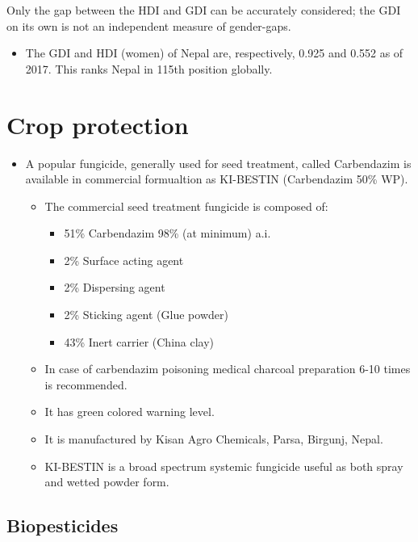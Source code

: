\documentclass[]{book}
\providecommand{\tightlist}{%
  \setlength{\itemsep}{0pt}\setlength{\parskip}{0pt}}
\begin{document}
Only the gap between the HDI and GDI can be accurately considered; the GDI on its own is not an independent measure of gender-gaps.

\begin{itemize}
\tightlist
\item
  The GDI and HDI (women) of Nepal are, respectively, 0.925 and 0.552 as of 2017. This ranks Nepal in 115th position globally.
\end{itemize}

\hypertarget{crop-protection}{%
\chapter{Crop protection}\label{crop-protection}}

\begin{itemize}
\tightlist
\item
  A popular fungicide, generally used for seed treatment, called Carbendazim is available in commercial formualtion as KI-BESTIN (Carbendazim 50\% WP).

  \begin{itemize}
  \tightlist
  \item
    The commercial seed treatment fungicide is composed of:

    \begin{itemize}
    \tightlist
    \item
      51\% Carbendazim 98\% (at minimum) a.i.
    \item
      2\% Surface acting agent
    \item
      2\% Dispersing agent
    \item
      2\% Sticking agent (Glue powder)
    \item
      43\% Inert carrier (China clay)
    \end{itemize}
  \item
    In case of carbendazim poisoning medical charcoal preparation 6-10 times is recommended.
  \item
    It has green colored warning level.
  \item
    It is manufactured by Kisan Agro Chemicals, Parsa, Birgunj, Nepal.
  \item
    KI-BESTIN is a broad spectrum systemic fungicide useful as both spray and wetted powder form.
  \end{itemize}
\end{itemize}

\hypertarget{biopesticides}{%
\section{Biopesticides}\label{biopesticides}}
\end{document}
